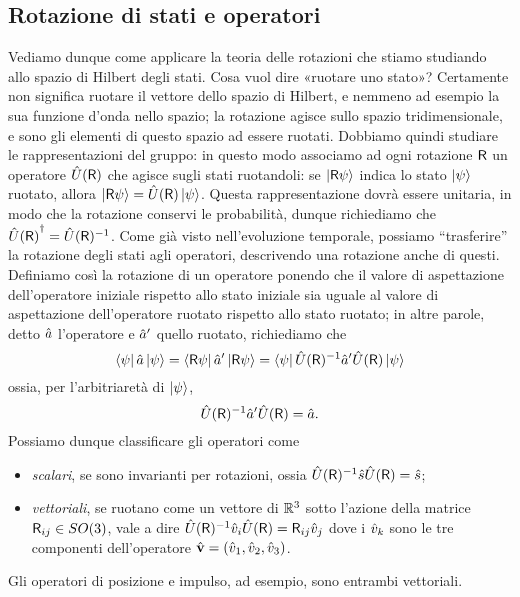 \subsection{Rotazione di stati e operatori}
Vediamo dunque come applicare la teoria delle rotazioni che stiamo studiando allo spazio di Hilbert degli stati.
Cosa vuol dire «ruotare uno stato»?
Certamente non significa ruotare il vettore dello spazio di Hilbert, e nemmeno ad esempio la sua funzione d'onda nello spazio; la rotazione agisce sullo spazio tridimensionale, e sono gli elementi di questo spazio ad essere ruotati.
Dobbiamo quindi studiare le rappresentazioni del gruppo: in questo modo associamo ad ogni rotazione $\mathsf{R}$ un operatore $\hat{U}(\mathsf{R})$ che agisce sugli stati ruotandoli: se $\left|{\mathsf{R}\psi}\right\rangle$ indica lo stato $\left|{\psi}\right\rangle$ ruotato, allora $\left|{\mathsf{R}\psi}\right\rangle=\hat{U}(\mathsf{R})\left|{\psi}\right\rangle$.
Questa rappresentazione dovrà essere unitaria, in modo che la rotazione conservi le probabilità, dunque richiediamo che ${\hat{U}(\mathsf{R})}^\dagger=\hat{U}(\mathsf{R})^{-1}$.
Come già visto nell'evoluzione temporale, possiamo ``trasferire'' la rotazione degli stati agli operatori, descrivendo una rotazione anche di questi.
Definiamo cos\`i la rotazione di un operatore ponendo che il valore di aspettazione dell'operatore iniziale rispetto allo stato iniziale sia uguale al valore di aspettazione dell'operatore ruotato rispetto allo stato ruotato; in altre parole, detto $\hat{a}$ l'operatore e $\hat{a}'$ quello ruotato, richiediamo che
\begin{equation}
	\left\langle{\psi}\right|\hat{a}\left|{\psi}\right\rangle=\left\langle{\mathsf{R}\psi}\right|\hat{a}'\left|{\mathsf{R}\psi}\right\rangle=\left\langle{\psi}\right|\hat{U}(\mathsf{R})^{-1}\hat{a}'\hat{U}(\mathsf{R})\left|{\psi}\right\rangle
\end{equation}
ossia, per l'arbitriaretà di $\left|{\psi}\right\rangle$,
\begin{equation}
	\hat{U}(\mathsf{R})^{-1}\hat{a}'\hat{U}(\mathsf{R})=\hat{a}.
	\label{eq:rotazione-operatore}
\end{equation}
Possiamo dunque classificare gli operatori come
\begin{itemize}
	\item \emph{scalari}, se sono invarianti per rotazioni, ossia $\hat{U}(\mathsf{R})^{-1}\hat{s}\hat{U}(\mathsf{R})=\hat{s}$;
	\item \emph{vettoriali}, se ruotano come un vettore di $\mathbb{R}^3$ sotto l'azione della matrice $\mathsf{R}_{ij}\in SO(3)$, vale a dire $\hat{U}(\mathsf{R})^{-1}\hat{v}_i\hat{U}(\mathsf{R})=\mathsf{R}_{ij}\hat{v}_j$ dove i $\hat{v}_k$ sono le tre componenti dell'operatore $\hat{\mathbf{v}}=(\hat{v}_1,\hat{v}_2,\hat{v}_3)$.
\end{itemize}
Gli operatori di posizione e impulso, ad esempio, sono entrambi vettoriali.

